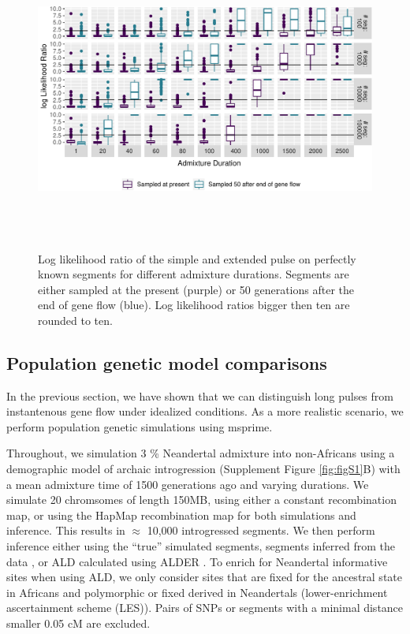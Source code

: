 \documentclass[11pt]{article}
\begin{document}
\begin{figure}
\centering
\includegraphics[width=16cm,height=10cm,keepaspectratio]{ATE_Revisions_files/figure-latex/figR1-1.pdf}
\caption{\label{fig:fig1_1} Log likelihood ratio of the simple and extended pulse on perfectly known segments for different admixture durations. Segments are either sampled at the present (purple) or 50 generations after the end of gene flow (blue). Log likelihood ratios bigger then ten are rounded to ten.}
\end{figure}


\subsection{Population genetic model comparisons}\label{Model comparison}
In the previous section, we have shown that we can distinguish long pulses from instantenous gene flow under idealized conditions. As a more realistic scenario, we perform population genetic simulations using  msprime\citep{kelleher_efficient_2016}. 

Throughout, we simulation 3 \% Neandertal admixture into non-Africans using a demographic model of archaic introgression (Supplement Figure \ref{fig:figS1}B) with a mean admixture time of 1500 generations ago and varying durations.  We simulate 20 chromsomes of length 150MB, using either a constant recombination map, or using the HapMap recombination map \cite{HapMapConsortium_second_2007} for both simulations and inference. This results in $\approx$ 10,000 introgressed segments. We then perform inference either using the ``true'' simulated segments, segments inferred from the data \citep{skov_detecting_2018}, or ALD calculated using ALDER \citep{loh_inferring_2013}. To enrich for Neandertal informative sites when using ALD, we only consider sites that are fixed for the ancestral state in Africans and polymorphic or fixed derived in Neandertals (lower-enrichment ascertainment scheme (LES)). Pairs of SNPs or segments with a minimal distance smaller 0.05 cM are excluded.
\end{document}
